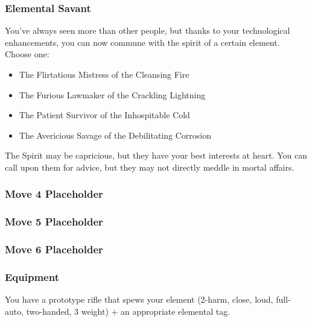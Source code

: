 \subsubsection{Elemental Savant}\label{sec:Elemental Savant}
You've always seen more than other people, but thanks to your technological enhancements, you can now commune with the spirit of a certain element. Choose one:
\begin{itemize}
\item The Flirtatious Mistress of the Cleansing Fire
\item The Furious Lawmaker of the Crackling Lightning
\item The Patient Survivor of the Inhospitable Cold
\item The Avericious Savage of the Debilitating Corrosion
\end{itemize}
The Spirit may be capricious, but they have your best interests at heart. You can call upon them for advice, but they may not directly meddle in mortal affairs.



\subsubsection {Move 4 Placeholder} %

\subsubsection {Move 5 Placeholder} %

\subsubsection {Move 6 Placeholder} %

\subsubsection{Equipment}
You have a prototype rifle that spews your element (2-harm, close, loud, full-auto, two-handed, 3 weight) + an appropriate elemental tag.

